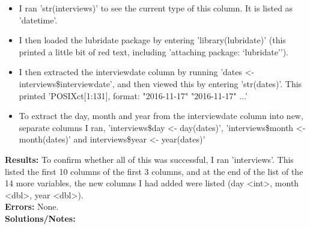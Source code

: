 \documentclass{article}
\begin{document}
\begin{FlushLeft}
\begin{itemize}
    \item I ran 'str(interviews)' to see the current type of this column. It is listed as 'datetime'.
    \item I then loaded the lubridate package by entering 'library(lubridate)' (this printed a little bit of red text, including 'attaching package: ‘lubridate’').
    \item I then extracted the interview\textunderscore date column by running 'dates \textless - interviews\$interview\textunderscore date', and then viewed this by entering 'str(dates)'. This printed  'POSIXct[1:131], format: "2016-11-17" "2016-11-17" ...'
    \item To extract the day, month and year from the interview\textunderscore date column into new, separate columns I ran, 'interviews\$day \textless - day(dates)', 'interviews\$month \textless - month(dates)' and 
    interviews\$year \textless - year(dates)'
\end{itemize}
\textbf{Results:} To confirm whether all of this was successful, I ran 'interviews'. This listed the first 10 columns of the first 3 columns, and at the end of the list of the 14 more variables, the new columns I had added were listed (day \textless int\textgreater, month \textless dbl\textgreater, year \textless dbl\textgreater).\\
\textbf{Errors:} None.\\
\textbf{Solutions/Notes:}\\


\end{FlushLeft}
\end{document}
